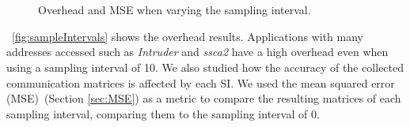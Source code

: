 
\begin{figure}[!t]
	\centering
\\
	\\
	\caption{Overhead and MSE when varying the sampling interval.
	}
	\label{fig:arraySumGraphs}
\end{figure}

\figurename~\ref{fig:sampleIntervals} shows the overhead results. Applications with many addresses accessed such as \emph{Intruder} and \emph{ssca2}
have a high overhead even when using a sampling interval of 10. We also studied how the accuracy of the collected communication matrices is affected by each SI. We used the mean squared error (MSE)~(Section \ref{sec:MSE}) as a metric to compare the resulting matrices of each sampling interval, comparing them to the sampling interval of 0.

